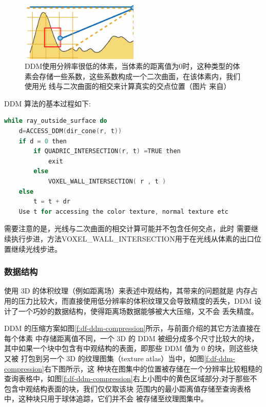 \begin{figure}
\sidecaption
	\includegraphics[width=0.5\textwidth]{figures/df/ddm-2}
	\caption{DDM使用分辨率很低的体素，当体素的距离值为0时，这种类型的体素会存储一些系数，这些系数构成一个二次曲面，在该体素内，我们使用光 线与二次曲面的相交来计算真实的交点位置（图片 来自\cite{a:directional-distance-maps}）}
	\label{f:df-ddm-2}
\end{figure}

DDM 算法的基本过程如下:

\begin{lstlisting}[language=C++, mathescape=true]
while ray_outside_surface do
	d=ACCESS_DDM(dir_cone(r, t))
	if d = 0 then
		if QUADRIC_INTERSECTION(r, t) =TRUE then
			exit
		else
			VOXEL_WALL_INTERSECTION( r , t )
	else
		t = t + dr
	Use t for accessing the color texture, normal texture etc
\end{lstlisting}

需要注意的是，光线与二次曲面的相交计算可能并不包含任何交点，此时 需要继续执行步进，方法VOXEL\_WALL\_INTERSECTION用于在光线从体素的出口位置继续光线步进。



\subsubsection{数据结构}
使用 3D 的体积纹理（例如距离场）来表述中观结构，其带来的问题就是 内存占用的压力比较大，而直接使用低分辨率的体积纹理又会导致精度的丢失，DDM 设计了一个巧妙的数据结构，使得距离场数据能够被大大压缩，又不会 丢失精度。

DDM 的压缩方案如图\ref{f:df-ddm-compression}所示，与前面介绍的其它方法直接在每个体素 中存储距离值不同，一个 3D 的 DDM 被细分成多个尺寸比较大的块，其中如果一个块中包含有中观结构的表面，即那些 DDM 值为 0 的块，则这些块又被 打包到另一个 3D 的纹理图集（texture atlas）当中，如图\ref{f:df-ddm-compression}右下图所示，这 种块在图集中的位置被存储在一个分辨率比较粗糙的查询表格中，如图\ref{f:df-ddm-compression}右上小图中的黄色区域部分;对于那些不包含中观结构表面的块，我们仅仅取该块 范围内的最小距离值存储至查询表格中，这种块只用于球体追踪，它们并不会 被存储至纹理图集中。

